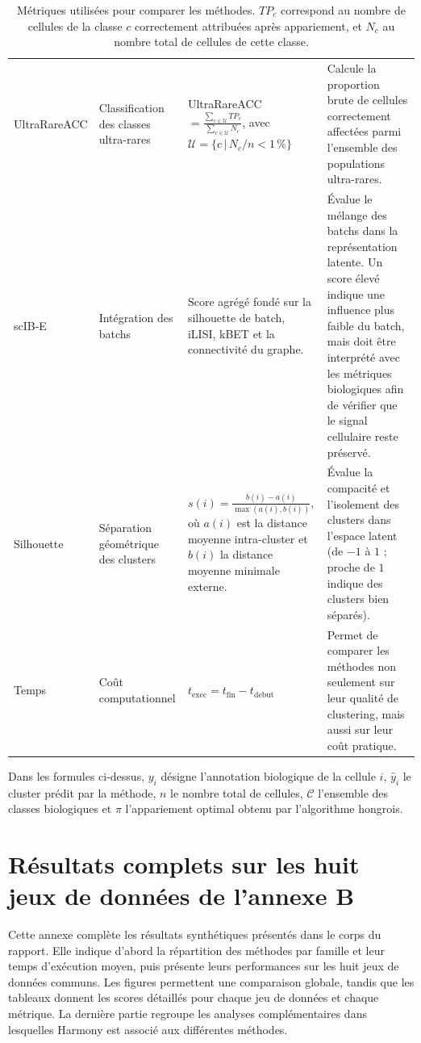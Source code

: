 \begin{table}[H]
\begin{tabularx}{\textwidth}{@{}p{}p{}p{}X@{}}
        UltraRareACC & Classification des classes ultra-rares & UltraRareACC\({}=\frac{\sum_{c\in\mathcal{U}}TP_c}{\sum_{c\in\mathcal{U}}N_c}\), avec \(\mathcal{U}=\{c\,|\,N_c/n<1\,\%\}\) & Calcule la proportion brute de cellules correctement affectées parmi l'ensemble des populations ultra-rares. \\
        scIB-E & Intégration des batchs & Score agrégé fondé sur la silhouette de batch, iLISI, kBET et la connectivité du graphe. & Évalue le mélange des batchs dans la représentation latente. Un score élevé indique une influence plus faible du batch, mais doit être interprété avec les métriques biologiques afin de vérifier que le signal cellulaire reste préservé. \\
        Silhouette & Séparation géométrique des clusters & \(s(i) = \frac{b(i) - a(i)}{\max(a(i), b(i))}\), où \(a(i)\) est la distance moyenne intra-cluster et \(b(i)\) la distance moyenne minimale externe. & Évalue la compacité et l'isolement des clusters dans l'espace latent (de \(-1\) à \(1\) ; proche de \(1\) indique des clusters bien séparés). \\
        Temps & Coût computationnel & \(t_{\mathrm{exec}}=t_{\mathrm{fin}}-t_{\mathrm{debut}}\) & Permet de comparer les méthodes non seulement sur leur qualité de clustering, mais aussi sur leur coût pratique. \\
        \bottomrule
    \end{tabularx}
    \caption{Métriques utilisées pour comparer les méthodes. \(TP_c\) correspond au nombre de cellules de la classe \(c\) correctement attribuées après appariement, et \(N_c\) au nombre total de cellules de cette classe.}
    \label{tab:metriques_evaluation}
\end{table}

Dans les formules ci-dessus, \(y_i\) désigne l'annotation biologique de la cellule \(i\), \(\hat{y}_i\) le cluster prédit par la méthode, \(n\) le nombre total de cellules, \(\mathcal{C}\) l'ensemble des classes biologiques et \(\pi\) l'appariement optimal obtenu par l'algorithme hongrois.

\newpage
\section{Résultats complets sur les huit jeux de données de l'annexe B}
\label{annexe:resultats_common8}

Cette annexe complète les résultats synthétiques présentés dans le corps du rapport. Elle indique d'abord la répartition des méthodes par famille et leur temps d'exécution moyen, puis présente leurs performances sur les huit jeux de données communs. Les figures permettent une comparaison globale, tandis que les tableaux donnent les scores détaillés pour chaque jeu de données et chaque métrique. La dernière partie regroupe les analyses complémentaires dans lesquelles Harmony est associé aux différentes méthodes.

